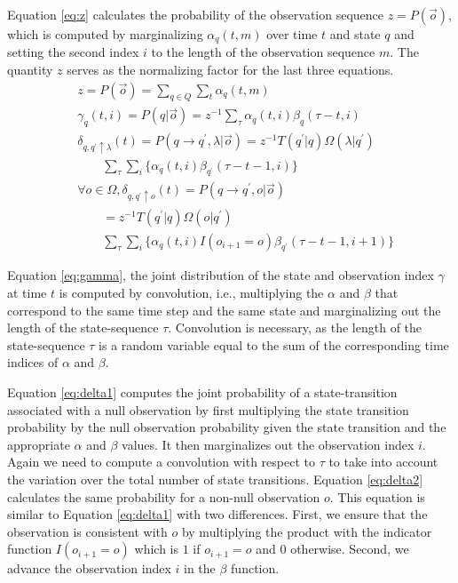 \documentclass[letterpaper]{article}
\begin{document}
Equation \ref{eq:z} calculates the probability of the observation sequence $z = P(\vec{o})$, which is computed by marginalizing $\alpha_q(t,m)$ over time $t$ and state $q$ and setting the second index $i$ to the length of the observation sequence $m$. The quantity $z$ serves as the normalizing factor for the last three equations.
{\footnotesize
\begin{align}
&z = P(\vec{o}) = \sum_{q \in Q} \sum_{t} \alpha_{q}(t,m) \label{eq:z}\\
&\gamma_q(t,i) = P(q | \vec{o}) = z^{-1} \sum_{\tau} \alpha_q(t,i) \beta_q(\tau-t,i) \label{eq:gamma}\\
&\delta_{q,q^\prime \uparrow \lambda}(t) = P(q \rightarrow q^\prime,\lambda | \vec{o}) = z^{-1}T(q^\prime | q) \Omega(\lambda |q^\prime) \label{eq:delta1}\\
&\qquad \sum_{\tau} \sum_i \{ \alpha_q(t,i) \beta_{q^\prime}(\tau-t-1,i) \} \nonumber\\
&\forall o \in \Omega, \delta_{q,q^\prime \uparrow o}(t) = P(q \rightarrow q^\prime,o | \vec{o}) \label{eq:delta2}\\
&\qquad = z^{-1}T(q^\prime | q) \Omega(o | q^\prime) \nonumber\\
&\qquad \sum_{\tau} \sum_i \{ \alpha_q(t,i) I(o_{i+1}=o) \beta_{q^\prime}(\tau-t-1,i+1) \} \nonumber
\end{align}
}%

Equation \ref{eq:gamma}, the joint distribution of the state and observation index $\gamma$ at time $t$ is computed by convolution, i.e., multiplying the $\alpha$ and $\beta$ that correspond to the same time step and the same state and marginalizing out the length of the state-sequence $\tau$. Convolution is necessary, as the length of the state-sequence $\tau$ is a random variable equal to the sum of the corresponding time indices of $\alpha$ and $\beta$.

Equation \ref{eq:delta1} computes the joint probability of a state-transition associated with a null observation by first multiplying the state transition probability by the null observation probability given the state transition and the appropriate $\alpha$ and $\beta$ values. It then marginalizes out the observation index $i$. Again we need to compute a convolution with respect to $\tau$ to take into account the variation over the total number of state transitions.
Equation \ref{eq:delta2} calculates the same probability for a non-null observation $o$. This equation is similar to Equation \ref{eq:delta1} with two differences.  First, we ensure that the observation is consistent with $o$ by multiplying the product with the indicator function $I(o_{i+1} = o)$ which is $1$ if $o_{i+1} = o$ and $0$ otherwise.  Second, we advance the observation index $i$ in the $\beta$ function.
\end{document}

